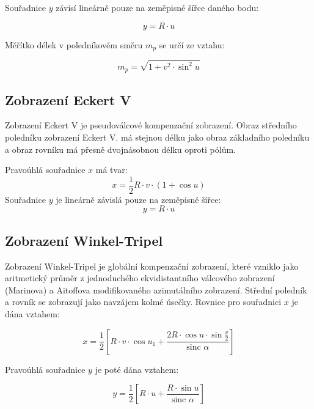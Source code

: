 \documentclass[12pt, a4paper]{article}
\begin{document}
\noindent Souřadnice $y$ závisí lineárně pouze na zeměpisné šířce daného bodu:

\vspace{3mm}
\[
y = R \cdot u
\]
\vspace{3mm}

\noindent Měřítko délek v poledníkovém směru $m_p$ se určí ze vztahu:

\vspace{3mm}
\[
m_p = \sqrt{1 + v^2 \cdot \sin^2 u}
\]

\subsection*{Zobrazení Eckert V}
\vspace{3mm}
Zobrazení Eckert V je pseudoválcové kompenzační zobrazení. Obraz středního poledníku zobrazení Eckert V. má stejnou délku jako obraz základního poledníku a obraz rovníku má přesně dvojnásobnou délku oproti pólům. 
\vspace{3mm}

\noindent Pravoúhlá souřadnice $x$ má tvar:
\vspace{3mm}
\[
x = \frac{1}{2} R \cdot v \cdot (1 + \cos u)
\]
\vspace{3mm}
\noindent Souřadnice $y$ je lineárně závislá pouze na zeměpisné šířce:
\vspace{3mm}
\[
y = R \cdot u
\]


\subsection*{Zobrazení Winkel-Tripel}
\vspace{3mm}
Zobrazení Winkel-Tripel je globální kompenzační zobrazení, které vzniklo jako aritmetický průměr z jednoduchého ekvidistantního válcového zobrazení (Marinova) a Aitoffova modifikovaného azimutálního zobrazení. Střední poledník a rovník se zobrazují jako navzájem kolmé úsečky. Rovnice pro souřadnici $x$ je dána vztahem:
\vspace{3mm}

\[
x = \frac{1}{2} \left[ R \cdot v \cdot \cos u_1 + \frac{2 R \cdot \cos u \cdot \sin \frac{v}{2}}{\text{sinc } \alpha} \right]
\]
\vspace{3mm}

\noindent Pravoúhlá souřadnice $y$ je poté dána vztahem:

\vspace{3mm}
\[
y = \frac{1}{2} \left[ R \cdot u + \frac{R \cdot \sin u}{\text{sinc } \alpha} \right]
\]
\vspace{3mm}
\end{document}

